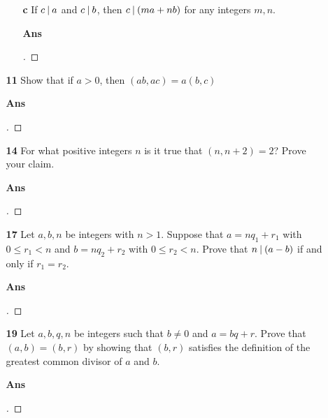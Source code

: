 \documentclass[paper=usletter, fontsize=12pt]{article}
\begin{document}
\begin{itemize}
\begin{itemize}
\begin{itemize}
                    \item[\textbf{c}] If $c \:\vert\: a$ and $c \:\vert\: b$, then $c
                    \:\vert\: (ma + nb)$ for any integers $m, n$.
                    \item[\textbf{Ans}]
                    \begin{proof}[\unskip\nopunct]
                    \end{proof}
                    \vspace{0.2in}

                \end{itemize}

                \item[\textbf{11}] Show that if $a > 0$, then $(ab, ac) = a(b,
                c)$
                \item[\textbf{Ans}]
                \begin{proof}[\unskip\nopunct]
                \end{proof}
                \vspace{0.2in}

                \item[\textbf{14}] For what positive integers $n$ is it true
                that $(n , n + 2) = 2$? Prove your claim.
                \item[\textbf{Ans}]
                \begin{proof}[\unskip\nopunct]
                \end{proof}
                \vspace{0.2in}

                \item[\textbf{17}] Let $a, b, n$ be integers with $n > 1$.
                Suppose that $a = nq_1 + r_1$ with $0 \le r_1 < n$ and $b =
                nq_2 + r_2$ with $0 \le r_2 < n$. Prove that $n \:\vert\: (a - b)$
                if and only if $r_1 = r_2$.
                \item[\textbf{Ans}]
                \begin{proof}[\unskip\nopunct]
                \end{proof}
                \vspace{0.2in}

                \item[\textbf{19}] Let $a, b, q, n$ be integers such that $b
                \ne 0$ and $a = bq + r$. Prove that $(a, b) = (b, r)$ by
                showing that $(b, r)$ satisfies the definition of the greatest
                common divisor of $a$ and $b$.
                \item[\textbf{Ans}]
                \begin{proof}[\unskip\nopunct]
                \end{proof}
                \vspace{0.2in}


\end{itemize}
\end{itemize}
\end{document}
